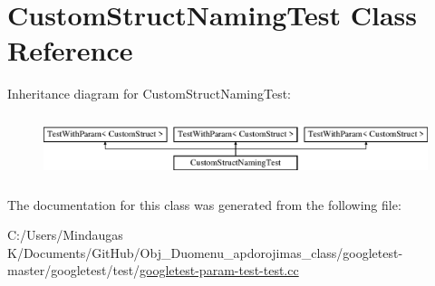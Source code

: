 \hypertarget{class_custom_struct_naming_test}{}\section{Custom\+Struct\+Naming\+Test Class Reference}
\label{class_custom_struct_naming_test}
Inheritance diagram for Custom\+Struct\+Naming\+Test\+:\begin{figure}[H]
\begin{center}
\leavevmode
\includegraphics[height=1.857380cm]{d2/d59/class_custom_struct_naming_test}
\end{center}
\end{figure}


The documentation for this class was generated from the following file\+:\begin{DoxyCompactItemize}
\item 
C\+:/\+Users/\+Mindaugas K/\+Documents/\+Git\+Hub/\+Obj\+\_\+\+Duomenu\+\_\+apdorojimas\+\_\+class/googletest-\/master/googletest/test/\mbox{\hyperlink{googletest-master_2googletest_2test_2googletest-param-test-test_8cc}{googletest-\/param-\/test-\/test.\+cc}}\end{DoxyCompactItemize}
